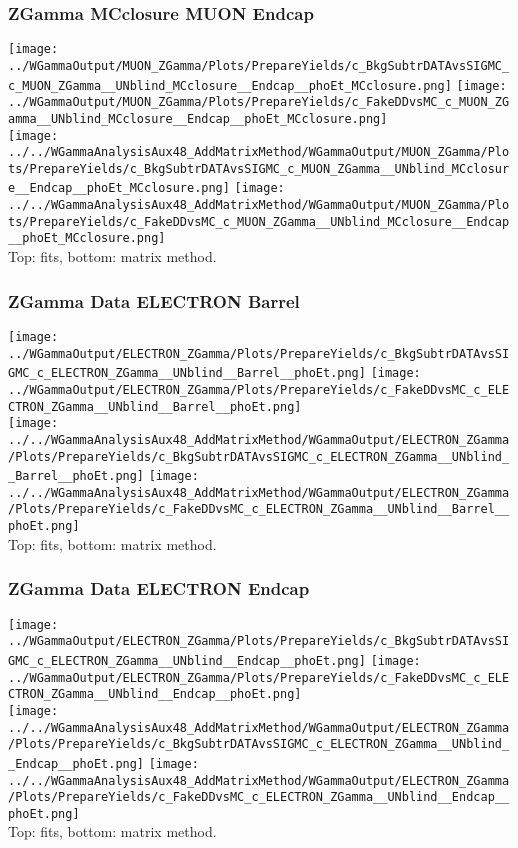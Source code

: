\documentclass{beamer}
\begin{document}
\begin{frame}\frametitle{ZGamma MCclosure MUON Endcap}
  \texttt{[image: ../WGammaOutput/MUON\_ZGamma/Plots/PrepareYields/c\_BkgSubtrDATAvsSIGMC\_c\_MUON\_ZGamma\_\_UNblind\_MCclosure\_\_Endcap\_\_phoEt\_MCclosure.png]} \texttt{[image: ../WGammaOutput/MUON\_ZGamma/Plots/PrepareYields/c\_FakeDDvsMC\_c\_MUON\_ZGamma\_\_UNblind\_MCclosure\_\_Endcap\_\_phoEt\_MCclosure.png]}\\
  \texttt{[image: ../../WGammaAnalysisAux48\_AddMatrixMethod/WGammaOutput/MUON\_ZGamma/Plots/PrepareYields/c\_BkgSubtrDATAvsSIGMC\_c\_MUON\_ZGamma\_\_UNblind\_MCclosure\_\_Endcap\_\_phoEt\_MCclosure.png]} \texttt{[image: ../../WGammaAnalysisAux48\_AddMatrixMethod/WGammaOutput/MUON\_ZGamma/Plots/PrepareYields/c\_FakeDDvsMC\_c\_MUON\_ZGamma\_\_UNblind\_MCclosure\_\_Endcap\_\_phoEt\_MCclosure.png]}\\
  \scriptsize Top: fits, bottom: matrix method.
\end{frame}

\begin{frame}\frametitle{ZGamma Data ELECTRON Barrel}
  \texttt{[image: ../WGammaOutput/ELECTRON\_ZGamma/Plots/PrepareYields/c\_BkgSubtrDATAvsSIGMC\_c\_ELECTRON\_ZGamma\_\_UNblind\_\_Barrel\_\_phoEt.png]} \texttt{[image: ../WGammaOutput/ELECTRON\_ZGamma/Plots/PrepareYields/c\_FakeDDvsMC\_c\_ELECTRON\_ZGamma\_\_UNblind\_\_Barrel\_\_phoEt.png]}\\
  \texttt{[image: ../../WGammaAnalysisAux48\_AddMatrixMethod/WGammaOutput/ELECTRON\_ZGamma/Plots/PrepareYields/c\_BkgSubtrDATAvsSIGMC\_c\_ELECTRON\_ZGamma\_\_UNblind\_\_Barrel\_\_phoEt.png]} \texttt{[image: ../../WGammaAnalysisAux48\_AddMatrixMethod/WGammaOutput/ELECTRON\_ZGamma/Plots/PrepareYields/c\_FakeDDvsMC\_c\_ELECTRON\_ZGamma\_\_UNblind\_\_Barrel\_\_phoEt.png]}\\
  \scriptsize Top: fits, bottom: matrix method.
\end{frame}

\begin{frame}\frametitle{ZGamma Data ELECTRON Endcap}
  \texttt{[image: ../WGammaOutput/ELECTRON\_ZGamma/Plots/PrepareYields/c\_BkgSubtrDATAvsSIGMC\_c\_ELECTRON\_ZGamma\_\_UNblind\_\_Endcap\_\_phoEt.png]} \texttt{[image: ../WGammaOutput/ELECTRON\_ZGamma/Plots/PrepareYields/c\_FakeDDvsMC\_c\_ELECTRON\_ZGamma\_\_UNblind\_\_Endcap\_\_phoEt.png]}\\
  \texttt{[image: ../../WGammaAnalysisAux48\_AddMatrixMethod/WGammaOutput/ELECTRON\_ZGamma/Plots/PrepareYields/c\_BkgSubtrDATAvsSIGMC\_c\_ELECTRON\_ZGamma\_\_UNblind\_\_Endcap\_\_phoEt.png]} \texttt{[image: ../../WGammaAnalysisAux48\_AddMatrixMethod/WGammaOutput/ELECTRON\_ZGamma/Plots/PrepareYields/c\_FakeDDvsMC\_c\_ELECTRON\_ZGamma\_\_UNblind\_\_Endcap\_\_phoEt.png]}\\
  \scriptsize Top: fits, bottom: matrix method.
\end{frame}
\end{document}
